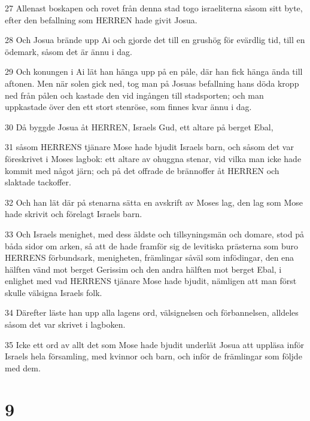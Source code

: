 \par 27 Allenast boskapen och rovet från denna stad togo israeliterna såsom sitt byte, efter den befallning som HERREN hade givit Josua.
\par 28 Och Josua brände upp Ai och gjorde det till en grushög för evärdlig tid, till en ödemark, såsom det är ännu i dag.
\par 29 Och konungen i Ai lät han hänga upp på en påle, där han fick hänga ända till aftonen. Men när solen gick ned, tog man på Josuas befallning hans döda kropp ned från pålen och kastade den vid ingången till stadsporten; och man uppkastade över den ett stort stenröse, som finnes kvar ännu i dag.
\par 30 Då byggde Josua åt HERREN, Israels Gud, ett altare på berget Ebal,
\par 31 såsom HERRENS tjänare Mose hade bjudit Israels barn, och såsom det var föreskrivet i Moses lagbok: ett altare av ohuggna stenar, vid vilka man icke hade kommit med något järn; och på det offrade de brännoffer åt HERREN och slaktade tackoffer.
\par 32 Och han lät där på stenarna sätta en avskrift av Moses lag, den lag som Mose hade skrivit och förelagt Israels barn.
\par 33 Och Israels menighet, med dess äldste och tillsyningsmän och domare, stod på båda sidor om arken, så att de hade framför sig de levitiska prästerna som buro HERRENS förbundsark, menigheten, främlingar såväl som infödingar, den ena hälften vänd mot berget Gerissim och den andra hälften mot berget Ebal, i enlighet med vad HERRENS tjänare Mose hade bjudit, nämligen att man först skulle välsigna Israels folk.
\par 34 Därefter läste han upp alla lagens ord, välsignelsen och förbannelsen, alldeles såsom det var skrivet i lagboken.
\par 35 Icke ett ord av allt det som Mose hade bjudit underlät Josua att uppläsa inför Israels hela församling, med kvinnor och barn, och inför de främlingar som följde med dem.

\chapter{9}

